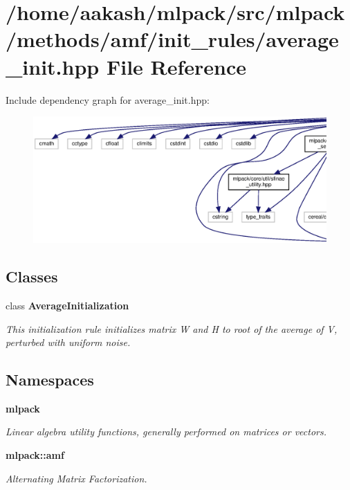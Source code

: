 \section{/home/aakash/mlpack/src/mlpack/methods/amf/init\+\_\+rules/average\+\_\+init.hpp File Reference}
\label{average__init_8hpp}
Include dependency graph for average\+\_\+init.\+hpp\+:
\nopagebreak
\begin{figure}[H]
\begin{center}
\leavevmode
\includegraphics[width=350pt]{average__init_8hpp__incl}
\end{center}
\end{figure}
\subsection*{Classes}
\begin{DoxyCompactItemize}
\item 
class \textbf{ Average\+Initialization}
\begin{DoxyCompactList}\small\item\em This initialization rule initializes matrix W and H to root of the average of V, perturbed with uniform noise. \end{DoxyCompactList}\end{DoxyCompactItemize}
\subsection*{Namespaces}
\begin{DoxyCompactItemize}
\item 
 \textbf{ mlpack}
\begin{DoxyCompactList}\small\item\em Linear algebra utility functions, generally performed on matrices or vectors. \end{DoxyCompactList}\item 
 \textbf{ mlpack\+::amf}
\begin{DoxyCompactList}\small\item\em Alternating Matrix Factorization. \end{DoxyCompactList}\end{DoxyCompactItemize}


